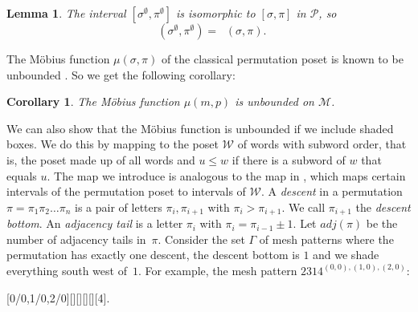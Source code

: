 \documentclass[preprint,11pt]{elsarticle}
\newtheorem{lem}[thm]{Lemma}\crefname{lem}{Lemma}{Lemmas}
\newtheorem{cor}[thm]{Corollary}\crefname{cor}{Corollary}{Corollaries}
\DeclareMathOperator{\muP}{\mu_\mathcal{P}}
\DeclareMathOperator{\muM}{\mu_\mathcal{M}}
\numberwithin{equation}{section}
\numberwithin{figure}{section}
\numberwithin{thm}{section}
\begin{document}
\begin{lem}
The interval $[\sigma^\emptyset,\pi^\emptyset]$ is isomorphic to
$[\sigma,\pi]$ in $\mathcal{P}$, so $$\muM(\sigma^\emptyset,\pi^\emptyset)=\muP(\sigma,\pi).$$
\end{lem}

The M\"obius function $\mu(\sigma,\pi)$ of the classical permutation poset is known to be
unbounded \cite{SagVat06}. So we get the following corollary:

\begin{cor}
The M\"obius function $\mu(m,p)$ is unbounded on $\mathcal{M}$.
\end{cor}

We can also show that the M\"obius function is unbounded if we include shaded boxes.
We do this by mapping to the poset $\mathcal{W}$ of words with subword order,  that is, 
the poset made up of all words and $u\le w$ if there is a subword of $w$
that equals $u$. The map we introduce is analogous to the map in \cite[Section 2]{Smith14},
which maps certain intervals of the permutation poset to intervals of $\mathcal{W}$.
A \emph{descent} in a permutation $\pi=\pi_1\pi_2\ldots\pi_n$ is a pair of
letters $\pi_i,\pi_{i+1}$ with $\pi_{i}>\pi_{i+1}$. We call $\pi_{i+1}$ the \emph{descent bottom}.
An \emph{adjacency tail} is a letter $\pi_i$ with $\pi_i=\pi_{i-1}\pm 1$.
Let $adj(\pi)$ be the number of adjacency tails in~$\pi$.
Consider the set $\Gamma$ of mesh patterns where the permutation has exactly one descent,
the descent bottom is $1$ and we shade everything south west of~$1$. For example, the mesh pattern $2314^{(0,0),(1,0),(2,0)}$:
\begin{center}
[0/0,1/0,2/0][][][][][4].
\end{center}
\end{document}
